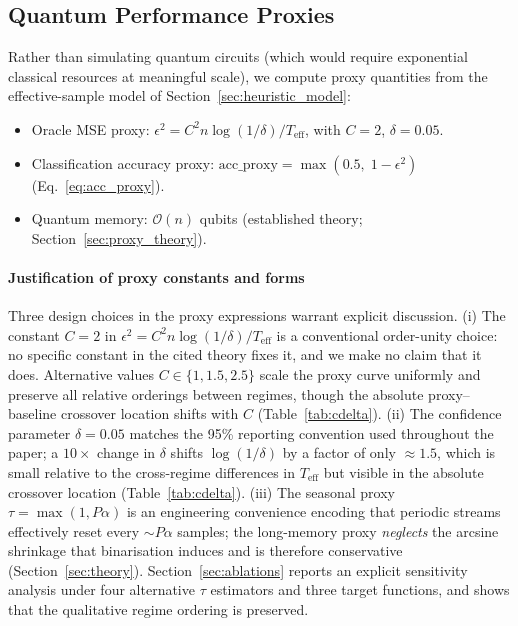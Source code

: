 \documentclass[sensors,article,submit,pdftex,moreauthors]{Definitions/mdpi}
\newcommand{\bigO}{\mathcal{O}}
\newcommand{\Teff}{T_{\mathrm{eff}}}
\begin{document}
\subsection{Quantum Performance Proxies}
\label{sec:quantum_proxies}

Rather than simulating quantum circuits (which would require exponential classical resources at meaningful scale), we compute proxy quantities from the effective-sample model of Section~\ref{sec:heuristic_model}:
\begin{itemize}
    \item Oracle MSE proxy: $\epsilon^2 = C^2 n \log(1/\delta) / \Teff$, with $C = 2$, $\delta = 0.05$.
    \item Classification accuracy proxy: $\mathrm{acc\_proxy} = \max(0.5,\; 1 - \epsilon^2)$ (Eq.~\ref{eq:acc_proxy}).
    \item Quantum memory: $\bigO(n)$ qubits (established theory; Section~\ref{sec:proxy_theory}).
\end{itemize}

\paragraph{Justification of proxy constants and forms} Three design choices in the proxy expressions warrant explicit discussion.
(i) The constant $C = 2$ in $\epsilon^2 = C^2 n \log(1/\delta) / \Teff$ is a conventional order-unity choice: no specific constant in the cited theory fixes it, and we make no claim that it does. Alternative values $C \in \{1, 1.5, 2.5\}$ scale the proxy curve uniformly and preserve all relative orderings between regimes, though the absolute proxy--baseline crossover location shifts with $C$ (Table~\ref{tab:cdelta}).
(ii) The confidence parameter $\delta = 0.05$ matches the 95\% reporting convention used throughout the paper; a $10\times$ change in $\delta$ shifts $\log(1/\delta)$ by a factor of only ${\approx}1.5$, which is small relative to the cross-regime differences in $\Teff$ but visible in the absolute crossover location (Table~\ref{tab:cdelta}).
(iii) The seasonal proxy $\tau = \max(1, P\alpha)$ is an engineering convenience encoding that periodic streams effectively reset every ${\sim}P\alpha$ samples; the long-memory proxy \emph{neglects} the arcsine shrinkage that binarisation induces \citep{vanvleck1966spectrum} and is therefore conservative (Section~\ref{sec:theory}). Section~\ref{sec:ablations} reports an explicit sensitivity analysis under four alternative $\tau$ estimators and three target functions, and shows that the qualitative regime ordering is preserved.
\end{document}
